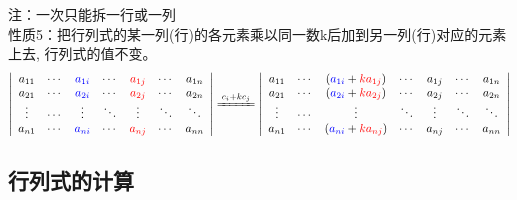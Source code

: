 {\color{red}注：}一次只能拆{\color{red}一行}或{\color{red}一列} \\
{\color{blue}性质5：}把行列式的某一列(行)的各元素乘以同一数k后加到另一列(行)对应的元素上去, 行列式的值不变。\\
$$
\left|
\begin{array}{ccccccc}
a_{11} & \cdots & {\color{blue} a_{1i}} & \cdots & {\color{red} a_{1j}} & \cdots & a_{1n} \\
a_{21} & \cdots & {\color{blue} a_{2i}} & \cdots & {\color{red} a_{2j}} & \cdots & a_{2n} \\
\vdots & \cdots & \vdots & \ddots & \vdots                & \ddots & \ddots \\
a_{n1} & \cdots & {\color{blue} a_{ni}} & \cdots & {\color{red} a_{nj}} & \cdots & a_{nn} \\
\end{array}\right|
\xlongequal{c_{i}+kc_{j}}
\left|
\begin{array}{ccccccc}
a_{11} & \cdots & ({\color{blue} a_{1i}}+{\color{red} ka_{1j}}) & \cdots & a_{1j} & \cdots & a_{1n} \\
a_{21} & \cdots & ({\color{blue} a_{2i}}+{\color{red} ka_{2j}}) & \cdots & a_{2j} & \cdots & a_{2n} \\
\vdots & \cdots & \vdots                                     & \ddots & \vdots & \ddots & \ddots \\
a_{n1} & \cdots & ({\color{blue} a_{ni}}+{\color{red} ka_{nj}}) & \cdots & a_{nj} & \cdots & a_{nn} \\
\end{array}\right|
$$
\subsection{行列式的计算}

